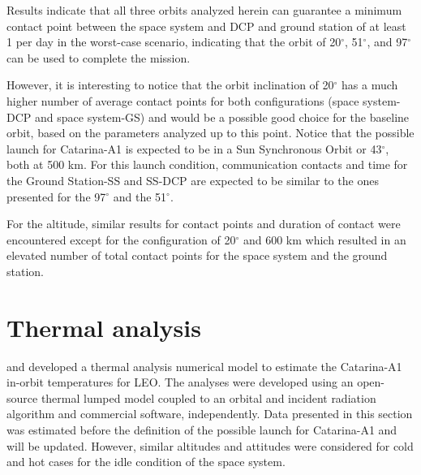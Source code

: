 

Results indicate that all three orbits analyzed herein can guarantee a minimum contact point between the space system and \ac{DCP} and ground station of at least 1  per day in the worst-case scenario, indicating that the orbit of 20$^{\circ}$, 51$^{\circ}$, and 97$^{\circ}$ can be used to complete the mission.

However, it is interesting to notice that the orbit inclination of 20$^{\circ}$ has a much higher number of average contact points for both configurations (space system-\ac{DCP} and space system-GS) and would be a possible good choice for the baseline orbit, based on the parameters analyzed up to this point. Notice that the possible launch for Catarina-A1 is expected to be in a Sun Synchronous Orbit or 43$^{\circ}$, both at 500 km. For this launch condition, communication contacts and time for the Ground Station-SS and SS-\ac{DCP} are expected to be similar to the ones presented for the 97$^{\circ}$ and the 51$^{\circ}$.

For the altitude, similar results for contact points and duration of contact were encountered except for the configuration of 20$^{\circ}$ and 600 km which resulted in an elevated number of total contact points for the space system and the ground station.

\section{Thermal analysis} \label{sec:thermal-analysis}

 \cite{COBEM-Cardozo} and \cite{gomes2022} developed a thermal analysis numerical model to estimate the Catarina-A1 in-orbit temperatures for \ac{LEO}. The analyses were developed using an open-source thermal lumped model coupled to an orbital and incident radiation algorithm and commercial software, independently.
Data presented in this section was estimated before the definition of the possible launch for Catarina-A1 and will be updated. However, similar altitudes and attitudes were considered for cold and hot cases for the idle condition of the space system.

